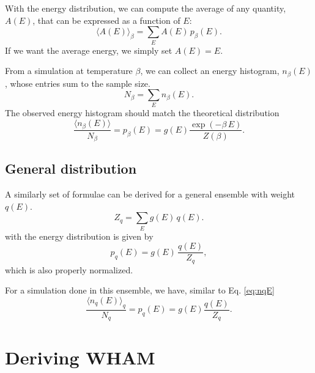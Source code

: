 \documentclass[aip,jcp,preprint,superscriptaddress]{revtex4-1}
\begin{document}
With the energy distribution,
we can compute the average of any quantity,
$A(E)$, that can be expressed as a function of $E$:
%
\begin{equation}
  \langle A(E) \rangle_\beta
=
  \sum_E A(E) \, p_\beta(E).
  \label{eq:pE_average}
\end{equation}
%
If we want the average energy,
we simply set $A(E) = E$.



From a simulation at temperature $\beta$,
we can collect an energy histogram, $n_\beta(E)$,
whose entries sum to the sample size.
%
\begin{equation}
  N_\beta = \sum_E n_\beta(E).
  \label{eq:nE_sum}
\end{equation}
%
The observed energy histogram
should match the theoretical distribution
\begin{equation}
  \frac{ \langle n_\beta(E) \rangle } { N_\beta }
=
  p_\beta(E)
=
  g(E) \frac{ \exp(-\beta \, E) } { Z(\beta) }.
  \label{eq:nE}
\end{equation}




\subsection{General distribution}



A similarly set of formulae
can be derived for a general ensemble
with weight $q(E)$.
%
\begin{equation}
  Z_q = \sum_E g(E) \, q(E).
  \label{eq:Zq_def}
\end{equation}
%
with the energy distribution is given by
%
\begin{equation}
  p_q(E) = g(E) \, \frac{ q(E) } { Z_q },
  \label{eq:pqE_def}
\end{equation}
%
which is also properly normalized.


For a simulation done in this ensemble,
we have, similar to Eq. \eqref{eq:nqE}
\begin{equation}
  \frac{ \langle n_q(E) \rangle_q } { N_q }
=
  p_q(E)
=
  g(E) \frac{ q(E) } { Z_q }.
  \label{eq:nqE}
\end{equation}





\section{Deriving WHAM}
\end{document}
